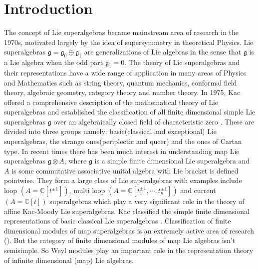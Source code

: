 \documentclass[11pt]{amsart}
\theoremstyle{plain}
\theoremstyle{definition}
\newcommand{\g}{\mathfrak{g}}
\begin{document}
\section{Introduction}\label{sec-intro}
The concept of Lie superalgebras became mainstream  area of research in the 1970s, motivated largely by the idea of supersymmetry in theoretical Physics. Lie superalgebras $\g=\g_{\bar{0}}\oplus\g_{\bar{1}}$ are generalizations of Lie algebras in the sense that $\g$ is a Lie algebra when the odd part $\g_{\bar{1}}=0$.  The theory of Lie superalgebras and their representations have a wide range of application in many areas of Physics and Mathematics such as string theory, quantum mechanics, conformal field theory, algebraic geometry, category theory and number theory. In 1975, Kac offered a comprehensive description of the mathematical theory of Lie superalgebras and established the classification of all finite dimensional simple Lie superalgebras $\g$ over an algebraically closed field of characteristic zero \cite{Kac1977}. These are divided into three groups namely: basic(classical and exceptional) Lie superalgebras, the strange ones(periplectic and queer) and the ones of Cartan type. In recent times there has been much interest in understanding  map Lie superalgebras $\g\otimes A$, where $\g$ is a simple finite dimensional Lie superalgebra and $A$ is some commutative associative unital algebra with Lie bracket is defined pointwise. They form a large class of Lie superalgebras with examples include loop $(A=\mathbb{C}[t^{\pm 1}])$, multi loop $(A=\mathbb{C}[t_1^{\pm 1}, \cdots, t_n^{\pm 1}])$ and current $(A=\mathbb{C}[t])$ superalgebras which play a very significant role in the theory of affine Kac-Moody Lie superalgebras. Kac classified the simple finite dimensional representations of basic classical Lie superalgebras \cite{Kac77a,Kac1978}. Classification of finite dimensional modules of map superalgebras is an extremely active area of research (\cite{Rao13, Sav14, CMS16, RZ04}). But the category of finite dimensional modules of map Lie algebras isn't semisimple. So
 Weyl modules play an important role in the representation theory of infinite dimensional (map) Lie algebras.
 
\end{document}
